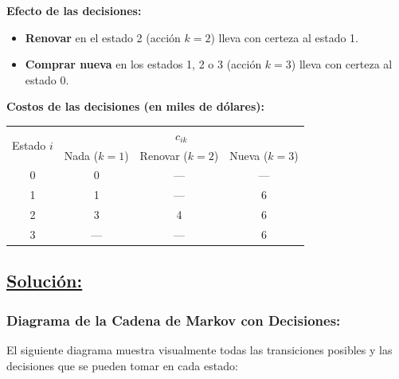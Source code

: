 \documentclass[a4paper,11pt]{article}
\begin{document}
\textbf{Efecto de las decisiones:}

\begin{itemize}
    \item \textbf{Renovar} en el estado 2 (acción $k=2$) lleva con certeza al estado 1.
    \item \textbf{Comprar nueva} en los estados 1, 2 o 3 (acción $k=3$) lleva con certeza al estado 0.
\end{itemize}

\textbf{Costos de las decisiones (en miles de dólares):}

\begin{center}
\begin{tabular}{c|ccc}
\toprule
\multirow{2}{*}{Estado $i$} & \multicolumn{3}{c}{$c_{ik}$} \\
  & Nada ($k=1$) & Renovar ($k=2$) & Nueva ($k=3$) \\
\midrule
0 & 0 & --- & --- \\
1 & 1 & --- & 6 \\
2 & 3 & 4 & 6 \\
3 & --- & --- & 6 \\
\bottomrule
\end{tabular}
\end{center}

\subsection*{\underline{Solución:}}

\subsubsection{Diagrama de la Cadena de Markov con Decisiones:}

El siguiente diagrama muestra visualmente todas las transiciones posibles y las decisiones que se pueden tomar en cada estado:
\end{document}
